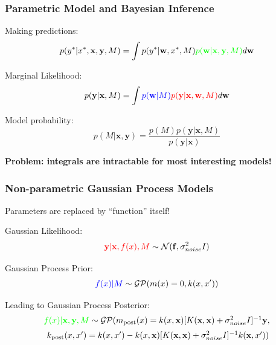 \documentclass[10pt]{beamer}
\newcommand{\bx}{\mathbf{x}}
\newcommand{\by}{\mathbf{y}}
\newcommand{\bw}{\mathbf{w}}
\newcommand{\boldf}{\mathbf{f}}
\newcommand{\gp}{\mathcal{GP}}
\newcommand{\gaussN}{\mathcal{N}}
\begin{document}
  \begin{frame}
    \frametitle{Parametric Model and Bayesian Inference}

    Making predictions:
      \begin{equation*}
        p(y^*|x^*,\bx,\by,M) = \int p(y^*|\bw,x^*,M) \textcolor{green}{p(\bw|\bx,\by,M)} d\bw
      \end{equation*}

    \pause

    Marginal Likelihood:
      \begin{equation*}
        p(\by|\bx,M) = \int \textcolor{blue}{p(\bw|M)} \textcolor{red}{p(\by|\bx, \bw, M)} d\bw
      \end{equation*}

    \pause

    Model probability:
      \begin{equation*}
        p(M|\bx,\by) = \frac{p(M)p(\by|\bx,M)}{p(\by|\bx)}
      \end{equation*}

    \pause

    \begin{center}
      \textbf{Problem: integrals are intractable for most interesting models!}
    \end{center}
  \end{frame}

  \begin{frame}
    \frametitle{Non-parametric Gaussian Process Models}
    Parameters are replaced by ``function'' itself!

    \pause

    Gaussian Likelihood:
      \begin{equation*}
        \textcolor{red}{\by|\bx,f(x),M} \sim \gaussN(\boldf, \sigma^2_{noise}I)
      \end{equation*}

    \pause

    Gaussian Process Prior:
      \begin{equation*}
        \textcolor{blue}{f(x)|M} \sim \gp(m(x) = 0, k(x,x'))
      \end{equation*}

    \pause

    Leading to Gaussian Process Posterior:
      \begin{equation*}
        \begin{array}{c}
          \textcolor{green}{f(x)|\bx,\by,M} \sim \gp ( m_{\text{post}}(x) = k(x,\bx)[K(\bx,\bx) + \sigma^2_{noise}I]^{-1} \by, \\[0.2cm]
          \; k_{\text{post}}(x,x') =  k(x,x') - k(x,\bx)[K(\bx,\bx) + \sigma^2_{noise}I]^{-1} k(\bx,x') )
        \end{array}
      \end{equation*}
    \end{frame}
\end{document}
